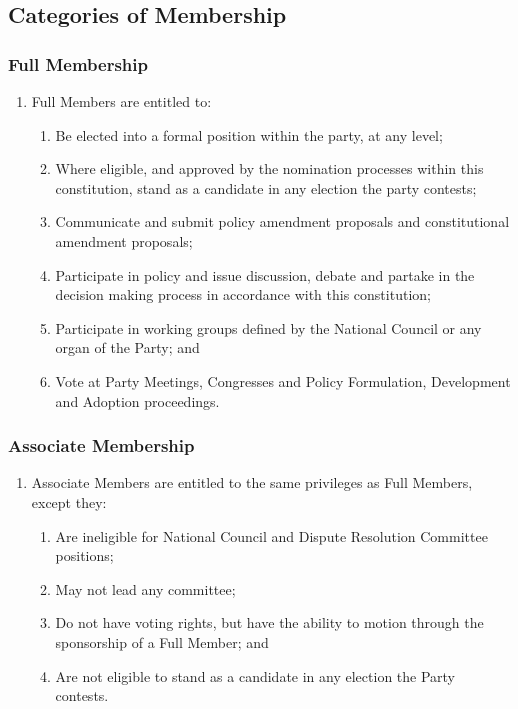 \documentclass[a4paper,titlepage,8.5pt]{article}
\begin{document}
\subsection{Categories of Membership}

\subsubsection{Full Membership}

\begin{enumerate}
\item Full Members are entitled to:
\begin{enumerate}
\item Be elected into a formal position within the party, at any level;
\item Where eligible, and approved by the nomination processes within this constitution, stand as a candidate in any election the party contests;
\item Communicate and submit policy amendment proposals and constitutional amendment proposals;
\item Participate in policy and issue discussion, debate and partake in the decision making process in accordance with this constitution;
\item Participate in working groups defined by the National Council or any organ of the Party; and
\item Vote at Party Meetings, Congresses and Policy Formulation, Development and Adoption proceedings.
\end{enumerate}
\end{enumerate}

\subsubsection{Associate Membership}

\begin{enumerate}
\item Associate Members are entitled to the same privileges as Full Members, except they:
\begin{enumerate}
\item Are ineligible for National Council and Dispute Resolution Committee positions;
\item May not lead any committee;
\item Do not have voting rights, but have the ability to motion through the sponsorship of a Full Member; and
\item Are not eligible to stand as a candidate in any election the Party contests.
\end{enumerate}
\end{enumerate}
\end{document}
